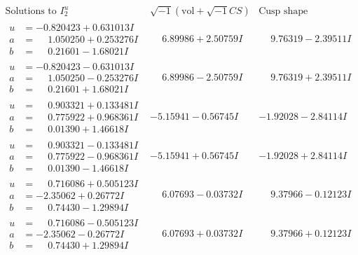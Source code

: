 \documentclass[1p]{elsarticle_modified}
\theoremstyle{definition}
\newcommand{\I}{\sqrt{-1}}
\begin{document}
$$\begin{array}{c|c|c}  
\text{Solutions to }I^u_{2}& \I (\text{vol} + \sqrt{-1}CS) & \text{Cusp shape}\\
 \hline 
\begin{aligned}
u &= -0.820423 + 0.631013 I \\
a &= \phantom{-}1.050250 + 0.253276 I \\
b &= \phantom{-}0.21601 - 1.68021 I\end{aligned}
 & \phantom{-}6.89986 + 2.50759 I & \phantom{-}9.76319 - 2.39511 I \\ \hline\begin{aligned}
u &= -0.820423 - 0.631013 I \\
a &= \phantom{-}1.050250 - 0.253276 I \\
b &= \phantom{-}0.21601 + 1.68021 I\end{aligned}
 & \phantom{-}6.89986 - 2.50759 I & \phantom{-}9.76319 + 2.39511 I \\ \hline\begin{aligned}
u &= \phantom{-}0.903321 + 0.133481 I \\
a &= \phantom{-}0.775922 + 0.968361 I \\
b &= \phantom{-}0.01390 + 1.46618 I\end{aligned}
 & -5.15941 - 0.56745 I & -1.92028 - 2.84114 I \\ \hline\begin{aligned}
u &= \phantom{-}0.903321 - 0.133481 I \\
a &= \phantom{-}0.775922 - 0.968361 I \\
b &= \phantom{-}0.01390 - 1.46618 I\end{aligned}
 & -5.15941 + 0.56745 I & -1.92028 + 2.84114 I \\ \hline\begin{aligned}
u &= \phantom{-}0.716086 + 0.505123 I \\
a &= -2.35062 + 0.26772 I \\
b &= \phantom{-}0.74430 - 1.29894 I\end{aligned}
 & \phantom{-}6.07693 - 0.03732 I & \phantom{-}9.37966 - 0.12123 I \\ \hline\begin{aligned}
u &= \phantom{-}0.716086 - 0.505123 I \\
a &= -2.35062 - 0.26772 I \\
b &= \phantom{-}0.74430 + 1.29894 I\end{aligned}
 & \phantom{-}6.07693 + 0.03732 I & \phantom{-}9.37966 + 0.12123 I \\ \hline\begin{aligned}

\end{aligned}
\end{array}$$
\end{document}
